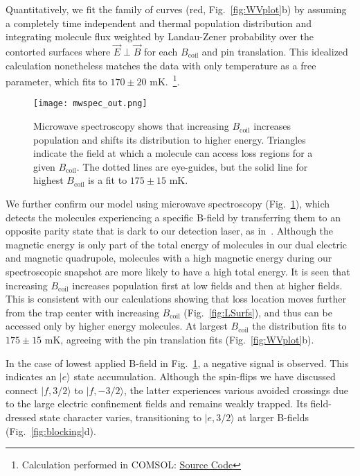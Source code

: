 \documentclass[%
 reprint,
 amsmath,amssymb,
 aps,
prl,
]{revtex4-1}
\newcommand{\bcl}{{$B_\text{coil}$}}
\newcommand{\epb}{{$\vec{E}\!\perp\!\vec{B}$}}
\begin{document}
Quantitatively, we fit the family of curves (red, Fig.~\ref{fig:WVplot}b) by assuming a completely time independent and thermal population distribution and integrating molecule flux weighted by Landau-Zener probability over the contorted surfaces where \epb{} for each \bcl{} and pin translation.
This idealized calculation nonetheless matches the data with only temperature as a free parameter, which fits to $170\pm20\text{ mK}$.~\footnote{Calculation performed in COMSOL: \href{https://github.com/dreens/spin-flip-integration/}{Source Code}}.

\begin{figure}[tb]
\texttt{[image: mwspec\_out.png]}%
\caption{
Microwave spectroscopy shows that increasing \bcl{} increases population and shifts its distribution to higher energy. 
Triangles indicate the field at which a molecule can access loss regions for a given \bcl. 
The dotted lines are eye-guides, but the solid line for highest \bcl{} is a fit to $175\pm15\text{ mK}$.
\label{fig:spec}}
\end{figure}

We further confirm our model using microwave spectroscopy (Fig.~\ref{fig:spec}), which detects the molecules experiencing a specific B-field by transferring them to an opposite parity state that is dark to our detection laser, as in~\cite{Stuhl2012evap}.
Although the magnetic energy is only part of the total energy of molecules in our dual electric and magnetic quadrupole, molecules with a high magnetic energy during our spectroscopic snapshot are more likely to have a high total energy. 
It is seen that increasing \bcl{} increases population first at low fields and then at higher fields. 
This is consistent with our calculations showing that loss location moves further from the trap center with increasing \bcl{} (Fig.~\ref{fig:LSurfs}), and thus can be accessed only by higher energy molecules. 
At largest \bcl{} the distribution fits to $175\pm15\text{ mK}$, agreeing with the pin translation fits (Fig.~\ref{fig:WVplot}b).

In the case of lowest applied B-field in Fig.~\ref{fig:spec}, a negative signal is observed. 
This indicates an $|e\rangle$ state accumulation. 
Although the spin-flips we have discussed connect $|f,3/2\rangle$ to $|f,-3/2\rangle$, the latter experiences various avoided crossings due to the large electric confinement fields and remains weakly trapped.  
Its field-dressed state character varies, transitioning to $|e,3/2\rangle$ at larger B-fields (Fig.~\ref{fig:blocking}d). 
\end{document}
